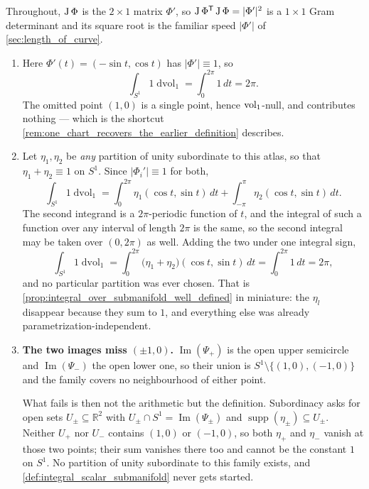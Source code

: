 \begin{exercisesolution}
\label{sol:ai_circle_two_atlases}
Throughout, $\operatorname{J}\Phi$ is the $2\times1$ matrix $\Phi'$, so
$\operatorname{J}\Phi^{\mathsf{T}}\operatorname{J}\Phi = \lvert\Phi'\rvert^2$ is a $1\times1$ Gram determinant and its square
root is the familiar speed $\lvert\Phi'\rvert$ of \cref{sec:length_of_curve}.
\begin{enumerate}[label=\textbf{(\alph*)}]
  \item Here $\Phi'(t) = (-\sin t,\cos t)$ has $\lvert\Phi'\rvert \equiv 1$, so
    \[\int_{S^1} 1 \mathop{d\text{vol}}_1 = \int_0^{2\pi} 1\,dt = 2\pi .\]
    The omitted point $(1,0)$ is a single point, hence $\operatorname{vol}_1$-null, and contributes nothing ---
    which is the shortcut \cref{rem:one_chart_recovers_the_earlier_definition} describes.
  \item Let $\eta_1,\eta_2$ be \emph{any} partition of unity subordinate to this atlas, so that
    $\eta_1+\eta_2 \equiv 1$ on $S^1$. Since $\lvert\Phi_i'\rvert \equiv 1$ for both,
    \[\int_{S^1} 1 \mathop{d\text{vol}}_1
      = \int_0^{2\pi}\eta_1(\cos t,\sin t)\,dt + \int_{-\pi}^{\pi}\eta_2(\cos t,\sin t)\,dt .\]
    The second integrand is a $2\pi$-periodic function of $t$, and the integral of such a function
    over any interval of length $2\pi$ is the same, so the second integral may be taken over
    $(0,2\pi)$ as well. Adding the two under one integral sign,
    \[\int_{S^1} 1 \mathop{d\text{vol}}_1
      = \int_0^{2\pi}\big(\eta_1+\eta_2\big)(\cos t,\sin t)\,dt
      = \int_0^{2\pi} 1\,dt = 2\pi ,\]
    and no particular partition was ever chosen. That is
    \cref{prop:integral_over_submanifold_well_defined} in miniature: the $\eta_l$ disappear
    because they sum to $1$, and everything else was already parametrization-independent.
  \item \textbf{The two images miss $(\pm1,0)$.} $\operatorname{Im}(\Psi_+)$ is the open upper
    semicircle and $\operatorname{Im}(\Psi_-)$ the open lower one, so their union is
    $S^1\setminus\{(1,0),(-1,0)\}$ and the family covers no neighbourhood of either point.

    What fails is then not the arithmetic but the definition. Subordinacy asks for open sets
    $U_\pm \subseteq \mathbb{R}^2$ with $U_\pm \cap S^1 = \operatorname{Im}(\Psi_\pm)$ and
    $\operatorname{supp}(\eta_\pm) \subseteq U_\pm$. Neither $U_+$ nor $U_-$ contains $(1,0)$ or
    $(-1,0)$, so both $\eta_+$ and $\eta_-$ vanish at those two points; their sum vanishes there
    too and cannot be the constant $1$ on $S^1$. No partition of unity subordinate to this family exists, and
    \cref{def:integral_scalar_submanifold} never gets started.


\end{enumerate}
\end{exercisesolution}
